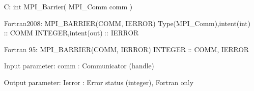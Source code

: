C:
int MPI_Barrier( MPI_Comm comm )

Fortran2008:
MPI_BARRIER(COMM, IERROR)
Type(MPI_Comm),intent(int) :: COMM
INTEGER,intent(out) :: IERROR

Fortran 95:
MPI_BARRIER(COMM, IERROR)
INTEGER :: COMM, IERROR

Input parameter:
comm : Communicator (handle)

Output parameter:
Ierror : Error status (integer), Fortran only
